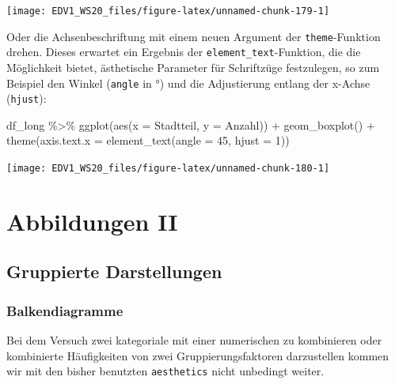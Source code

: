 \documentclass[
]{book}
\newenvironment{Shaded}{\begin{snugshade}}{\end{snugshade}}
\newcommand{\AttributeTok}[1]{\textcolor[rgb]{0.77,0.63,0.00}{#1}}
\newcommand{\DecValTok}[1]{\textcolor[rgb]{0.00,0.00,0.81}{#1}}
\newcommand{\FunctionTok}[1]{\textcolor[rgb]{0.00,0.00,0.00}{#1}}
\newcommand{\NormalTok}[1]{#1}
\newcommand{\SpecialCharTok}[1]{\textcolor[rgb]{0.00,0.00,0.00}{#1}}
\begin{document}
\begin{center}\texttt{[image: EDV1\_WS20\_files/figure-latex/unnamed-chunk-179-1]} \end{center}

Oder die Achsenbeschriftung mit einem neuen Argument der \texttt{theme}-Funktion drehen. Dieses erwartet ein Ergebnis der \texttt{element\_text}-Funktion, die die Möglichkeit bietet, ästhetische Parameter für Schriftzüge festzulegen, so zum Beispiel den Winkel (\texttt{angle} in °) und die Adjustierung entlang der x-Achse (\texttt{hjust}):

\begin{Shaded}
\begin{Highlighting}[]
\NormalTok{df\_long }\SpecialCharTok{\%\textgreater{}\%} 
  \FunctionTok{ggplot}\NormalTok{(}\FunctionTok{aes}\NormalTok{(}\AttributeTok{x =}\NormalTok{ Stadtteil, }
             \AttributeTok{y =}\NormalTok{ Anzahl)) }\SpecialCharTok{+}
  \FunctionTok{geom\_boxplot}\NormalTok{() }\SpecialCharTok{+}
  \FunctionTok{theme}\NormalTok{(}\AttributeTok{axis.text.x =} \FunctionTok{element\_text}\NormalTok{(}\AttributeTok{angle =} \DecValTok{45}\NormalTok{,}
                                   \AttributeTok{hjust =} \DecValTok{1}\NormalTok{))}
\end{Highlighting}
\end{Shaded}

\begin{center}\texttt{[image: EDV1\_WS20\_files/figure-latex/unnamed-chunk-180-1]} \end{center}

\hypertarget{abbildungen-ii}{%
\chapter{Abbildungen II}\label{abbildungen-ii}}

\hypertarget{gruppierte-darstellungen}{%
\section{Gruppierte Darstellungen}\label{gruppierte-darstellungen}}

\hypertarget{balkendiagramme-1}{%
\subsection{Balkendiagramme}\label{balkendiagramme-1}}

Bei dem Versuch zwei kategoriale mit einer numerischen zu kombinieren oder kombinierte Häufigkeiten von zwei Gruppierungsfaktoren darzustellen kommen wir mit den bisher benutzten \texttt{aesthetics} nicht unbedingt weiter.
\end{document}
